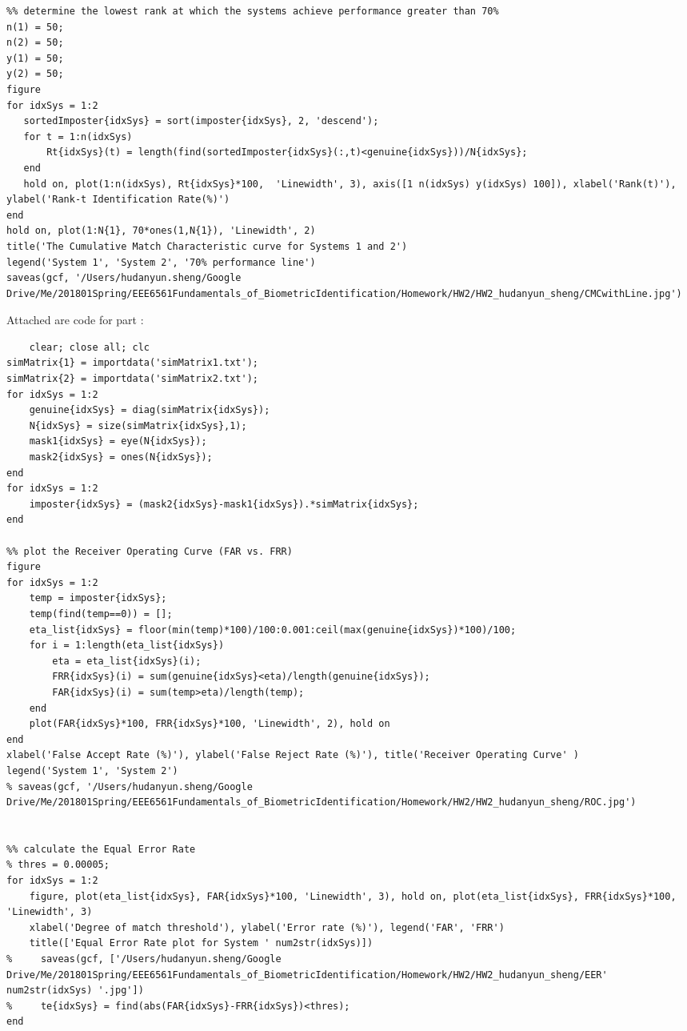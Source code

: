\documentclass[a4paper]{article}
\begin{document}
\begin{spacing}{2.0}
\begin{lstlisting}
%% determine the lowest rank at which the systems achieve performance greater than 70%
n(1) = 50;
n(2) = 50;
y(1) = 50;
y(2) = 50;
figure
for idxSys = 1:2
   sortedImposter{idxSys} = sort(imposter{idxSys}, 2, 'descend');
   for t = 1:n(idxSys)
       Rt{idxSys}(t) = length(find(sortedImposter{idxSys}(:,t)<genuine{idxSys}))/N{idxSys};
   end
   hold on, plot(1:n(idxSys), Rt{idxSys}*100,  'Linewidth', 3), axis([1 n(idxSys) y(idxSys) 100]), xlabel('Rank(t)'), ylabel('Rank-t Identification Rate(%)')
end
hold on, plot(1:N{1}, 70*ones(1,N{1}), 'Linewidth', 2)
title('The Cumulative Match Characteristic curve for Systems 1 and 2')
legend('System 1', 'System 2', '70% performance line')
saveas(gcf, '/Users/hudanyun.sheng/Google Drive/Me/201801Spring/EEE6561Fundamentals_of_BiometricIdentification/Homework/HW2/HW2_hudanyun_sheng/CMCwithLine.jpg')
	\end{lstlisting}
	
	\newpage
	\large{Attached are code for part \uppercase\expandafter{} }:
	\normalsize
	\begin{lstlisting}
	clear; close all; clc
simMatrix{1} = importdata('simMatrix1.txt');
simMatrix{2} = importdata('simMatrix2.txt');
for idxSys = 1:2
    genuine{idxSys} = diag(simMatrix{idxSys});
    N{idxSys} = size(simMatrix{idxSys},1);
    mask1{idxSys} = eye(N{idxSys});
    mask2{idxSys} = ones(N{idxSys});
end
for idxSys = 1:2
    imposter{idxSys} = (mask2{idxSys}-mask1{idxSys}).*simMatrix{idxSys};
end

%% plot the Receiver Operating Curve (FAR vs. FRR)
figure
for idxSys = 1:2
    temp = imposter{idxSys};
    temp(find(temp==0)) = [];
    eta_list{idxSys} = floor(min(temp)*100)/100:0.001:ceil(max(genuine{idxSys})*100)/100;
    for i = 1:length(eta_list{idxSys})
        eta = eta_list{idxSys}(i);
        FRR{idxSys}(i) = sum(genuine{idxSys}<eta)/length(genuine{idxSys});
        FAR{idxSys}(i) = sum(temp>eta)/length(temp);
    end
    plot(FAR{idxSys}*100, FRR{idxSys}*100, 'Linewidth', 2), hold on
end
xlabel('False Accept Rate (%)'), ylabel('False Reject Rate (%)'), title('Receiver Operating Curve' )
legend('System 1', 'System 2')
% saveas(gcf, '/Users/hudanyun.sheng/Google Drive/Me/201801Spring/EEE6561Fundamentals_of_BiometricIdentification/Homework/HW2/HW2_hudanyun_sheng/ROC.jpg')


%% calculate the Equal Error Rate
% thres = 0.00005;
for idxSys = 1:2
    figure, plot(eta_list{idxSys}, FAR{idxSys}*100, 'Linewidth', 3), hold on, plot(eta_list{idxSys}, FRR{idxSys}*100, 'Linewidth', 3)
    xlabel('Degree of match threshold'), ylabel('Error rate (%)'), legend('FAR', 'FRR')
    title(['Equal Error Rate plot for System ' num2str(idxSys)])
%     saveas(gcf, ['/Users/hudanyun.sheng/Google Drive/Me/201801Spring/EEE6561Fundamentals_of_BiometricIdentification/Homework/HW2/HW2_hudanyun_sheng/EER' num2str(idxSys) '.jpg'])
%     te{idxSys} = find(abs(FAR{idxSys}-FRR{idxSys})<thres);
end


\end{lstlisting}
\end{spacing}
\end{document}
